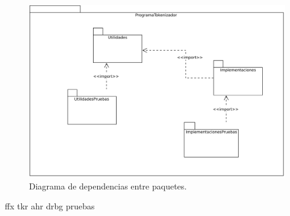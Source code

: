 \begin{figure}
  \begin{center}
    \includegraphics[width=0.6\linewidth]{diagramas/paquetes.png}
    \caption{Diagrama de dependencias entre paquetes.}
    \label{paquetes_general}
  \end{center}
\end{figure}

{ffx}
{tkr}
{ahr}
{drbg}
{pruebas}
